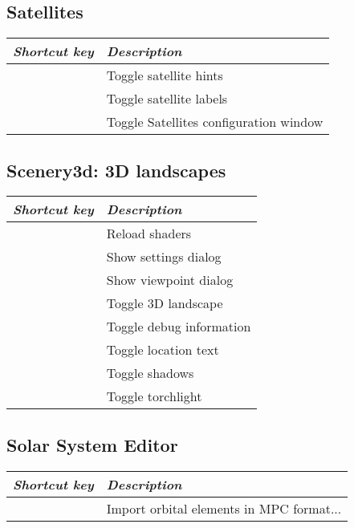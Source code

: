 \subsection{Satellites}
\label{ch:Hotkeys:Plugins:Satellites}
\begin{longtabu}to \textwidth {cl} 
\toprule
\emph{Shortcut key}	& \emph{Description}\\\midrule
{}		& Toggle satellite hints \\
	& Toggle satellite labels \\
			& Toggle Satellites configuration window \\
\bottomrule
\end{longtabu}

\subsection{Scenery3d: 3D landscapes}
\label{ch:Hotkeys:Plugins:Scenery3d}
\begin{longtabu}to \textwidth {cl} 
\toprule
\emph{Shortcut key}	& \emph{Description}\\\midrule
{}	& Reload shaders \\
	& Show settings dialog \\
	& Show viewpoint dialog \\
		& Toggle 3D landscape \\
	& Toggle debug information \\
	& Toggle location text \\
	& Toggle shadows \\
	& Toggle torchlight \\
\bottomrule
\end{longtabu}

\subsection{Solar System Editor}
\label{ch:Hotkeys:Plugins:SolarSystemEditor}
\begin{longtabu}to \textwidth {cl} 
\toprule
\emph{Shortcut key}	& \emph{Description}\\\midrule
{}	& Import orbital elements in MPC format... \\
\bottomrule
\end{longtabu}

